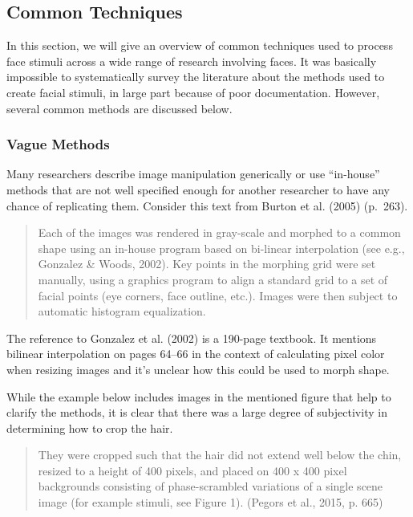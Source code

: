 \documentclass[
  man,floatsintext]{apa6}
\begin{document}
\hypertarget{common-techniques}{%
\subsection{Common Techniques}\label{common-techniques}}

In this section, we will give an overview of common techniques used to process face stimuli across a wide range of research involving faces. It was basically impossible to systematically survey the literature about the methods used to create facial stimuli, in large part because of poor documentation. However, several common methods are discussed below.

\hypertarget{vague-methods}{%
\subsubsection{Vague Methods}\label{vague-methods}}

Many researchers describe image manipulation generically or use ``in-house'' methods that are not well specified enough for another researcher to have any chance of replicating them. Consider this text from Burton et al. (2005) (p.~263).

\begin{quote}
Each of the images was rendered in gray-scale and morphed to a common shape using an in-house program based on bi-linear interpolation (see e.g., Gonzalez \& Woods, 2002). Key points in the morphing grid were set manually, using a graphics program to align a standard grid to a set of facial points (eye corners, face outline, etc.). Images were then subject to automatic histogram equalization.
\end{quote}

The reference to Gonzalez et al. (2002) is a 190-page textbook. It mentions bilinear interpolation on pages 64--66 in the context of calculating pixel color when resizing images and it's unclear how this could be used to morph shape.

While the example below includes images in the mentioned figure that help to clarify the methods, it is clear that there was a large degree of subjectivity in determining how to crop the hair.

\begin{quote}
They were cropped such that the hair did not extend well below the chin, resized to a height of 400 pixels, and placed on 400 x 400 pixel backgrounds consisting of phase-scrambled variations of a single scene image (for example stimuli, see Figure 1). (Pegors et al., 2015, p. 665)
\end{quote}
\end{document}
